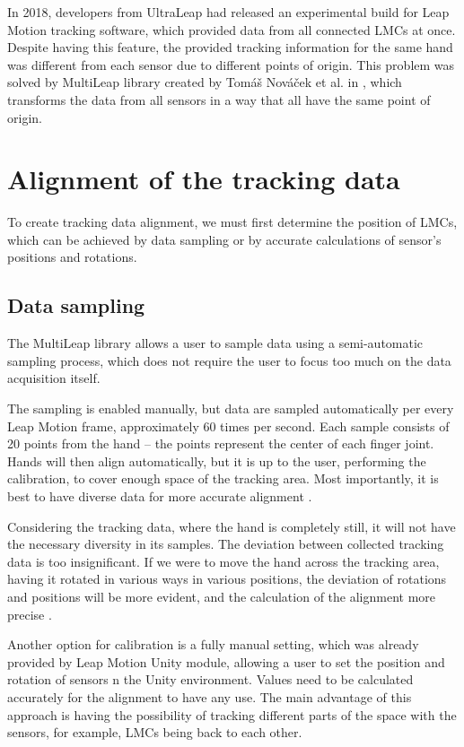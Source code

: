 
In 2018, developers from UltraLeap had released an experimental build for Leap Motion tracking software, which provided data from all connected LMCs at once. Despite having this feature, the provided tracking information for the same hand was different from each sensor due to different points of origin. This problem was solved by MultiLeap library created by Tomáš Nováček et al. in \cite{tomasMultileap}, which transforms the data from all sensors in a way that all have the same point of origin.

\section{Alignment of the tracking data}

To create tracking data alignment, we must first determine the position of LMCs, which can be achieved by data sampling or by accurate calculations of sensor's positions and rotations.

\subsection{Data sampling}

The MultiLeap library allows a user to sample data using a semi-automatic sampling process, which does not require the user to focus too much on the data acquisition itself.

The sampling is enabled manually, but data are sampled automatically per every Leap Motion frame, approximately 60 times per second. Each sample consists of 20 points from the hand – the points represent the center of each finger joint. Hands will then align automatically, but it is up to the user, performing the calibration, to cover enough space of the tracking area. Most importantly, it is best to have diverse data for more accurate alignment \cite{tomasMultileap}.

Considering the tracking data, where the hand is completely still, it will not have the necessary diversity in its samples. The deviation between collected tracking data is too insignificant. If we were to move the hand across the tracking area, having it rotated in various ways in various positions, the deviation of rotations and positions will be more evident, and the calculation of the alignment more precise \cite{tomasMultileap}.

Another option for calibration is a fully manual setting, which was already provided by Leap Motion Unity module, allowing a user to set the position and rotation of sensors n the Unity environment. Values need to be calculated accurately for the alignment to have any use. The main advantage of this approach is having the possibility of tracking different parts of the space with the sensors, for example, LMCs being back to each other.

